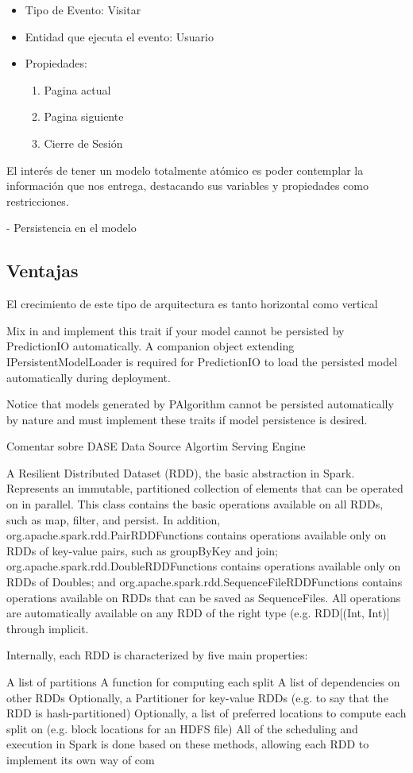     \begin{itemize}
      \item Tipo de Evento: Visitar
      \item Entidad que ejecuta el evento: Usuario
      \item Propiedades:
          \begin{enumerate}
            \item Pagina actual
            \item Pagina siguiente
            \item Cierre de Sesión
          \end{enumerate}
    \end{itemize}



    El interés de tener un modelo totalmente atómico es poder contemplar la información que nos entrega, destacando sus variables y propiedades como restricciones.


    - Persistencia en el modelo


  \subsection{Ventajas }

El crecimiento de este tipo de arquitectura es tanto horizontal como vertical


  Mix in and implement this trait if your model cannot be persisted by PredictionIO automatically. A companion object extending IPersistentModelLoader is required for PredictionIO to load the persisted model automatically during deployment.

Notice that models generated by PAlgorithm cannot be persisted automatically by nature and must implement these traits if model persistence is desired.



Comentar sobre DASE
Data Source
Algortim
Serving
Engine


A Resilient Distributed Dataset (RDD), the basic abstraction in Spark. Represents an immutable, partitioned collection of elements that can be operated on in parallel. This class contains the basic operations available on all RDDs, such as map, filter, and persist. In addition, org.apache.spark.rdd.PairRDDFunctions contains operations available only on RDDs of key-value pairs, such as groupByKey and join; org.apache.spark.rdd.DoubleRDDFunctions contains operations available only on RDDs of Doubles; and org.apache.spark.rdd.SequenceFileRDDFunctions contains operations available on RDDs that can be saved as SequenceFiles. All operations are automatically available on any RDD of the right type (e.g. RDD[(Int, Int)] through implicit.

Internally, each RDD is characterized by five main properties:

A list of partitions
A function for computing each split
A list of dependencies on other RDDs
Optionally, a Partitioner for key-value RDDs (e.g. to say that the RDD is hash-partitioned)
Optionally, a list of preferred locations to compute each split on (e.g. block locations for an HDFS file)
All of the scheduling and execution in Spark is done based on these methods, allowing each RDD to implement its own way of com